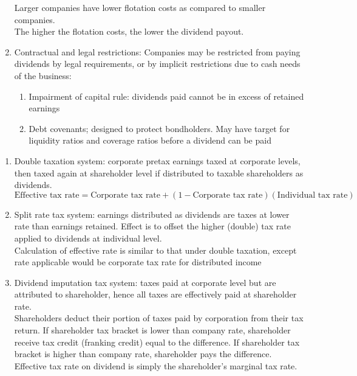 \begin{remark}
\begin{enumerate}[label=\roman*.]
Larger companies have lower flotation costs as compared to smaller companies.\\
The higher the flotation costs, the lower the dividend payout.
\item Contractual and legal restrictions: Companies may be restricted from paying dividends by legal requirements, or by implicit restrictions due to cash needs of the business:
\begin{enumerate}[label=\arabic*.]
\setlength{\itemsep}{0pt}
\item Impairment of capital rule: dividends paid cannot be in excess of retained earnings
\item Debt covenants; designed to protect bondholders. May have target for liquidity ratios and coverage ratios before a dividend can be paid
\end{enumerate}
\end{enumerate}
\end{remark}


\begin{definition} 
\begin{enumerate}[label=\roman*.]
\setlength{\itemsep}{0pt}
\item Double taxation system: corporate pretax earnings taxed at corporate levels, then taxed again at shareholder level if distributed to taxable shareholders as dividends.
\begin{equation}
\text{Effective tax rate} = \text{Corporate tax rate} + (1-\text{Corporate tax rate})(\text{Individual tax rate}) \nonumber
\end{equation}
\item Split rate tax system: earnings distributed as dividends are taxes at lower rate than earnings retained. Effect is to offset the higher (double) tax rate applied to dividends at individual level.\\
Calculation of effective rate is similar to that under double taxation, except rate applicable would be corporate tax rate for distributed income
\item Dividend imputation tax system: taxes paid at corporate level but are attributed to shareholder, hence all taxes are effectively paid at shareholder rate.\\
Shareholders deduct their portion of taxes paid by corporation from their tax return. If shareholder tax bracket is lower than company rate, shareholder receive tax credit (franking credit) equal to the difference. If shareholder tax bracket is higher than company rate, shareholder pays the difference.\\
Effective tax rate on dividend is simply the shareholder's marginal tax rate.
\end{enumerate}
\end{definition}

